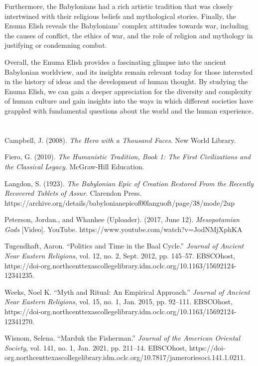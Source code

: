 \documentclass[12pt,a4paper,english]{article}
\begin{document}
Furthermore, the Babylonians had a rich artistic tradition that was closely intertwined with their religious beliefs and mythological stories. 
Finally, the Enuma Elish reveals the Babylonians' complex attitudes towards war, including the causes of conflict, the ethics of war, and the role of religion and mythology in justifying or condemning combat.

Overall, the Enuma Elish provides a fascinating glimpse into the ancient Babylonian worldview, and its insights remain relevant today for those interested in the history of ideas and the development of human thought. 
By studying the Enuma Elish, we can gain a deeper appreciation for the diversity and complexity of human culture and gain insights into the ways in which different societies have grappled with fundamental questions about the world and the human experience.

\newpage
\section*{}
\begin{hangparas}{2em}{1}
  Campbell, J. (2008). \emph{The Hero with a Thousand Faces}. New World Library.
  \par
  Fiero, G. (2010). \emph{The Humanistic Tradition, Book 1: The First Civilizations and the Classical Legacy}. McGraw-Hill Education.
  \par
  Langdon, S. (1923). \emph{The Babylonian Epic of Creation Restored From the Recently Recovered Tablets of Assur}. Clarendon Press. https://archive.org/details/babylonianepicof00languoft/page/38/mode/2up
  \par
  Peterson, Jordan., and Whanhee (Uploader). (2017, June 12). \emph{Mesopotamian Gods} [Video]. YouTube. https://www.youtube.com/watch?v=JodNMjXphKA
  \par
Tugendhaft, Aaron. “Politics and Time in the Baal Cycle.” \emph{Journal of Ancient Near Eastern Religions}, vol. 12, no. 2, Sept. 2012, pp. 145–57. EBSCOhost, https://doi-org.northcenttexascollegelibrary.idm.oclc.org/10.1163/15692124-12341235.
  \par
  Weeks, Noel K. “Myth and Ritual: An Empirical Approach.” \emph{Journal of Ancient Near Eastern Religions}, vol. 15, no. 1, Jan. 2015, pp. 92–111. EBSCOhost, https://doi-org.northcenttexascollegelibrary.idm.oclc.org/10.1163/15692124-12341270.
  \par
Wisnom, Selena. “Marduk the Fisherman.” \emph{Journal of the American Oriental Society}, vol. 141, no. 1, Jan. 2021, pp. 211–14. EBSCOhost, https://doi-org.northcenttexascollegelibrary.idm.oclc.org/10.7817/jameroriesoci.141.1.0211.
\end{hangparas}
\par
\fussy
\end{document}
